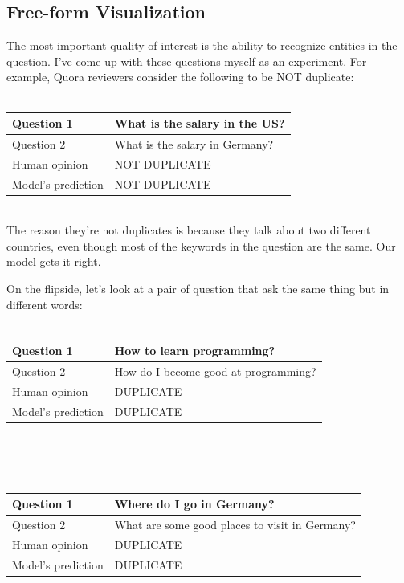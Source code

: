 \documentclass{article}
\begin{document}
\subsection{Free-form Visualization}

The most important quality of interest is the ability to recognize entities in the question. I've come up with these questions myself as an experiment. For example, Quora reviewers consider the following to be NOT duplicate:
\\\\
\begin{tabular}{|l|l|}
\hline
Question 1 & What is the salary in the US? \\ \hline
Question 2 & What is the salary in Germany? \\ \hline
Human opinion & NOT DUPLICATE \\ \hline
Model's prediction & NOT DUPLICATE \\ \hline
\end{tabular}\\

The reason they're not duplicates is because they talk about two different countries, even though most of the keywords in the question are the same. Our model gets it right.

On the flipside, let's look at a pair of question that ask the same thing but in different words:
\\\\
\begin{tabular}{|l|l|}
\hline
Question 1 & How to learn programming? \\ \hline
Question 2 & How do I become good at programming? \\ \hline
Human opinion & DUPLICATE \\ \hline
Model's prediction & DUPLICATE \\ \hline
\end{tabular}\\
\\\\
\begin{tabular}{|l|l|}
\hline
Question 1 & Where do I go in Germany? \\ \hline
Question 2 & What are some good places to visit in Germany? \\ \hline
Human opinion & DUPLICATE \\ \hline
Model's prediction & DUPLICATE \\ \hline
\end{tabular}\\
\end{document}
